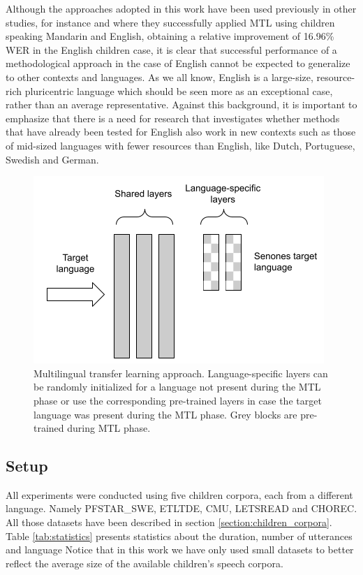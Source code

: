 Although the approaches adopted in this work have been used previously in other studies, for instance \cite{TransferLF} and \cite{2019multi} where they successfully applied MTL using children speaking  Mandarin and English, obtaining a relative improvement of 16.96\% WER in the English children case, it is clear that successful performance of a methodological approach in the case of English cannot be expected to generalize to other contexts and languages.  
As we all know, English is a large-size, resource-rich pluricentric language which should be seen more as an exceptional case, rather than an average representative. Against this background, it is important to emphasize that there is a need for research that investigates whether methods that have already been tested for English also work in new contexts such as those of mid-sized languages with fewer resources than English, like Dutch, Portuguese, Swedish and German. 
\begin{figure}[t]
\begin{center}
\includegraphics[scale=0.5]{imgs/Ours_final.png}
\caption{Multilingual transfer learning approach. Language-specific layers can be randomly initialized for a language not present during the MTL phase or use the corresponding pre-trained layers in case the target language was present during the MTL phase. Grey blocks are pre-trained during MTL phase.}
\label{fig:MLTL1}
\end{center}
\end{figure}


\subsection{Setup}
\label{section:corpus}
All experiments were conducted using five children corpora, each from a different language. Namely PFSTAR\_SWE, ETLTDE, CMU, LETSREAD and CHOREC. All those datasets have been described in section \ref{section:children_corpora}.%
Table \ref{tab:statistics} presents statistics about the duration, number of utterances and language %
Notice that in this work we have only used small datasets to better reflect the average size of the available children's speech corpora.

